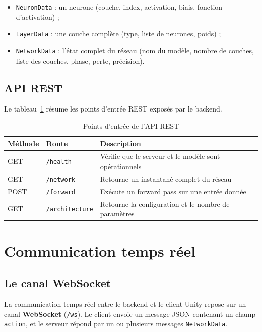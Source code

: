 \documentclass[12pt,a4paper]{report}
\begin{document}
\begin{itemize}
    \item \texttt{NeuronData} : un neurone (couche, index, activation, biais,
    fonction d'activation) ;
    \item \texttt{LayerData} : une couche compl\`ete (type, liste de
    neurones, poids) ;
    \item \texttt{NetworkData} : l'\'etat complet du r\'eseau (nom du
    mod\`ele, nombre de couches, liste des couches, phase, perte,
    pr\'ecision).
\end{itemize}

\section{API REST}

Le tableau~\ref{tab:rest} r\'esume les points d'entr\'ee REST expos\'es par
le backend.

\begin{table}[h!]
\centering
\begin{tabular}{lll}
\toprule
\textbf{M\'ethode} & \textbf{Route} & \textbf{Description} \\
\midrule
GET & \texttt{/health} & V\'erifie que le serveur et le mod\`ele sont op\'erationnels \\
GET & \texttt{/network} & Retourne un instantan\'e complet du r\'eseau \\
POST & \texttt{/forward} & Ex\'ecute un forward pass sur une entr\'ee donn\'ee \\
GET & \texttt{/architecture} & Retourne la configuration et le nombre de param\`etres \\
\bottomrule
\end{tabular}
\caption{Points d'entr\'ee de l'API REST}
\label{tab:rest}
\end{table}


\chapter{Communication temps r\'eel}
\label{chap:comm}

\section{Le canal WebSocket}

La communication temps r\'eel entre le backend et le client Unity repose sur
un canal \textbf{WebSocket} (\texttt{/ws}). Le client envoie un message JSON
contenant un champ \texttt{action}, et le serveur r\'epond par un ou
plusieurs messages \texttt{NetworkData}.
\end{document}
